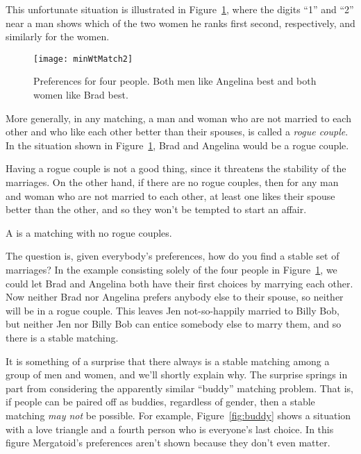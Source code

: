 This unfortunate situation is illustrated in
Figure~\ref{fig:minWtMatch2}, where the digits ``1'' and ``2'' near a
man shows which of the two women he ranks first second, respectively,
and similarly for the women.

\begin{figure}[h]
\texttt{[image: minWtMatch2]}

\caption{Preferences for four people.  Both men like Angelina best and
both women like Brad best.}
\label{fig:minWtMatch2}
\end{figure}

More generally, in any matching, a man and woman who are not married
to each other and who like each other better than their spouses, is
called a \emph{rogue couple}.  In the situation shown in
Figure~\ref{fig:minWtMatch2}, Brad and Angelina would be a rogue
couple.

Having a rogue couple is not a good thing, since it threatens the
stability of the marriages.  On the other hand, if there are no rogue
couples, then for any man and woman who are not married to each other,
at least one likes their spouse better than the other, and so they
won't be tempted to start an affair.

\begin{definition}
  A  is a matching with no rogue couples.
\end{definition}

The question is, given everybody's preferences, how do you find a
stable set of marriages?  In the example consisting solely of the four
people in Figure~\ref{fig:minWtMatch2}, we could let Brad and Angelina
both have their first choices by marrying each other.  Now neither
Brad nor Angelina prefers anybody else to their spouse, so neither
will be in a rogue couple.  This leaves Jen not-so-happily married to
Billy Bob, but neither Jen nor Billy Bob can entice somebody else to
marry them, and so there is a stable matching.

It is something of a surprise that there always is a stable matching
among a group of men and women, and we'll shortly explain why.  The
surprise springs in part from considering the apparently similar
``buddy'' matching problem.  That is, if people can be paired off as
buddies, regardless of gender, then a stable matching \emph{may not}
be possible.  For example, Figure~\ref{fig:buddy} shows a situation
with a love triangle and a fourth person who is everyone's last
choice.  In this figure Mergatoid's preferences aren't shown because
they don't even matter.

